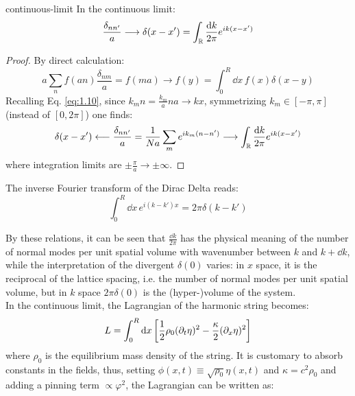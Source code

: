 \begin{proposition}{}{continuous-limit}
  In the continuous limit:
  \begin{equation*}
    \frac{\delta_{nn'}}{a} \longrightarrow \delta(x - x') = \int_{\mathbb{R}} \frac{\mathrm{d} k}{2\pi} e^{i k (x - x')}
  \end{equation*}
  \tcblower
\begin{proof}
  By direct calculation:
  \begin{equation*}
    a \sum_{n} f(an) \frac{\delta_{nm}}{a} = f(ma) \longrightarrow f(y) = \int_0^R \dd x\, f(x) \delta(x - y)
  \end{equation*}
  Recalling Eq. \ref{eq:1.10}, since $ k_m n = \frac{k_m}{a} na \rightarrow k x $, symmetrizing $ k_m \in [-\pi, \pi] $ (instead of $ [0, 2\pi] $) one finds:
  \begin{equation*}
    \delta(x - x') \longleftarrow \frac{\delta_{nn'}}{a} = \frac{1}{Na} \sum_{m} e^{ik_m (n - n')} \longrightarrow \int_{\mathbb{R}} \frac{\mathrm{d} k}{2\pi} e^{ik (x - x')}
  \end{equation*}
  where integration limits are $ \pm \frac{\pi}{a} \rightarrow \pm \infty $.
\end{proof}
\end{proposition}
\begin{proposition}{}{}
  The inverse Fourier transform of the Dirac Delta reads:
  \begin{equation*}
    \int_0^R \dd x\, e^{i (k - k') x} = 2\pi \delta(k - k')
  \end{equation*}
\end{proposition}
By these relations, it can be seen that $ \frac{\dd k}{2\pi} $ has the physical meaning of the number of normal modes per unit spatial volume with wavenumber between $ k $ and $ k + \dd k $, while the interpretation of the divergent $ \delta(0) $ varies: in $ x $ space, it is the reciprocal of the lattice spacing, i.e. the number of normal modes per unit spatial volume, but in $ k $ space $ 2\pi \delta(0) $ is the (hyper-)volume of the system.\\
In the continuous limit, the Lagrangian of the harmonic string becomes:
\begin{equation*}
  L = \int_0^R \mathrm{d} x \left[ \frac{1}{2} \rho_0 (\partial_t \eta)^2 - \frac{\kappa}{2} (\partial_x \eta)^2 \right]
\end{equation*}
where $ \rho_0 $ is the equilibrium mass density of the string. It is customary to absorb constants in the fields, thus, setting $ \phi(x,t) \equiv \sqrt{\rho_0} \eta(x,t) $ and $ \kappa = c^2 \rho_0 $ and adding a pinning term $ \propto \varphi^2 $, the Lagrangian can be written as:
